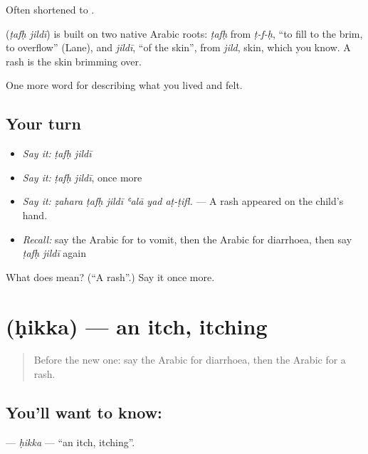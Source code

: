 Often shortened to .

\begin{cousinweb}
\textbf{ } (\emph{ṭafḥ jildī}) is built on two native Arabic roots: \emph{ṭafḥ} from \emph{ṭ-f-ḥ}, \textquotedblleft{}to fill to the brim, to overflow\textquotedblright{} (Lane), and \emph{jildī}, \textquotedblleft{}of the skin\textquotedblright{}, from \emph{jild}, skin, which you know. A rash is the skin brimming over.
\end{cousinweb}

\begin{grammarlens}[title={What you've built}]
One more word for describing what you lived and felt.
\end{grammarlens}

\subsection*{Your turn}
\begin{itemize}
\raggedright
  \item \emph{Say it:} \emph{ṭafḥ jildī}
  \item \emph{Say it:} \emph{ṭafḥ jildī}, once more
  \item \emph{Say it:} \emph{ẓahara ṭafḥ jildī ʿalā yad aṭ-ṭifl.} — A rash appeared on the child's hand.
  \item \emph{Recall:} say the Arabic for to vomit, then the Arabic for diarrhoea, then say \emph{ṭafḥ jildī} again
\end{itemize}

\begin{tcolorbox}[breakable,colback=teal!4,colframe=teal!35!black,title={Before you move on}]
What does   mean? (\textquotedblleft{}A rash\textquotedblright{}.) Say it once more.
\end{tcolorbox}
\section[\texorpdfstring{\ar{حكة} (ḥikka)}{حكة (ḥikka)}]{ (ḥikka) — an itch, itching}

\label{lesson:AR-C508-hikka}



\begin{quote}
Before the new one: say the Arabic for diarrhoea, then the Arabic for a rash.
\end{quote}

\subsection*{You'll want to know: }
\textbf{} — \emph{ḥikka} — \textquotedblleft{}an itch, itching\textquotedblright{}.


